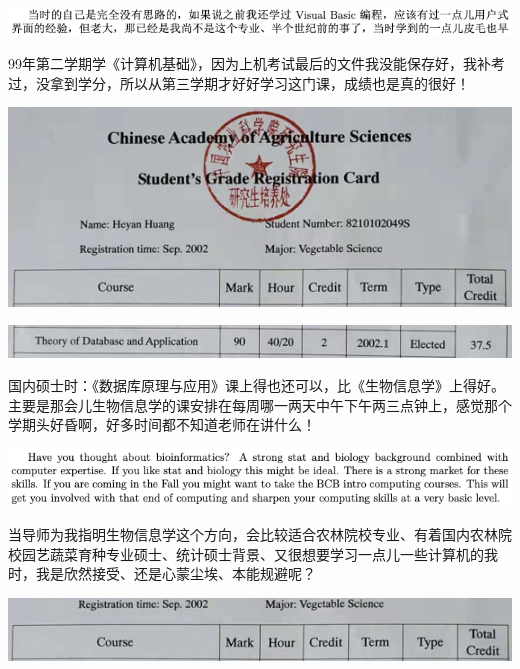 \documentclass[9pt, b5paper]{article}
\begin{document}
\begin{center}
\includegraphics[width=.9\linewidth]{./pic/backups_plans_20210421_134614.png}
\end{center}

99年第二学期学《计算机基础》，因为上机考试最后的文件我没能保存好，我补考过，没拿到学分，所以从第三学期才好好学习这门课，成绩也是真的很好！

\begin{center}
\includegraphics[width=.9\linewidth]{./pic/backups_plans_20210419_094833.png}
\end{center}

\begin{center}
\includegraphics[width=.9\linewidth]{./pic/backups_plans_20210421_135421.png}
\end{center}

国内硕士时：《数据库原理与应用》课上得也还可以，比《生物信息学》上得好。主要是那会儿生物信息学的课安排在每周哪一两天中午下午两三点钟上，感觉那个学期头好昏啊，好多时间都不知道老师在讲什么！

\begin{center}
\includegraphics[width=.9\linewidth]{./pic/backups_plans_20210421_090620.png}
\end{center}

当导师为我指明生物信息学这个方向，会比较适合农林院校专业、有着国内农林院校园艺蔬菜育种专业硕士、统计硕士背景、又很想要学习一点儿一些计算机的我时，我是欣然接受、还是心蒙尘埃、本能规避呢？

\begin{center}
\includegraphics[width=.9\linewidth]{./pic/backups_plans_20210421_135356.png}
\end{center}
\end{document}
